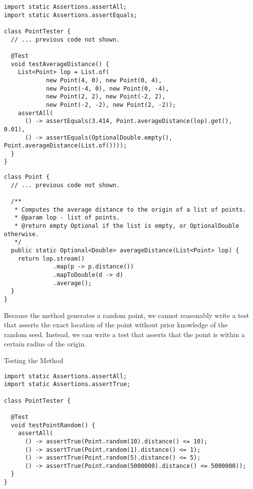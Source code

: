 \begin{cl}[]{}
\begin{lstlisting}[language=MyJava]
import static Assertions.assertAll;
import static Assertions.assertEquals;

class PointTester {
  // ... previous code not shown.

  @Test
  void testAverageDistance() {
    List<Point> lop = List.of(
            new Point(4, 0), new Point(0, 4),
            new Point(-4, 0), new Point(0, -4),
            new Point(2, 2), new Point(-2, 2),
            new Point(-2, -2), new Point(2, -2));
    assertAll(
      () -> assertEquals(3.414, Point.averageDistance(lop).get(), 0.01),
      () -> assertEquals(OptionalDouble.empty(), Point.averageDistance(List.of())));
  }
}
\end{lstlisting}
\end{cl}

\begin{cl}[]{}
\begin{lstlisting}[language=MyJava]
class Point {
  // ... previous code not shown. 

  /**
   * Computes the average distance to the origin of a list of points.
   * @param lop - list of points.
   * @return empty Optional if the list is empty, or OptionalDouble otherwise.
   */
  public static Optional<Double> averageDistance(List<Point> lop) {
    return lop.stream()
              .map(p -> p.distance())
              .mapToDouble(d -> d)
              .average();
  }
}
\end{lstlisting}
\end{cl}


Because the  method generates a random point, we cannot reasonably write a test that asserts the exact location of the point without prior knowledge of the random seed. Instead, we can write a test that asserts that the point is within a certain radius of the origin. 

\begin{cl}{Testing the  Method}
\begin{lstlisting}[language=MyJava]
import static Assertions.assertAll;
import static Assertions.assertTrue;

class PointTester {

  @Test
  void testPointRandom() {
    assertAll(
      () -> assertTrue(Point.random(10).distance() <= 10);
      () -> assertTrue(Point.random(1).distance() <= 1);
      () -> assertTrue(Point.random(5).distance() <= 5);
      () -> assertTrue(Point.random(5000000).distance() <= 5000000));
  }
}
\end{lstlisting}
\end{cl}

